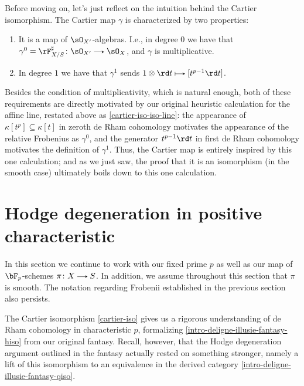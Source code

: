 Before moving on, let's just reflect on the intuition behind the Cartier isomorphism. The Cartier map $\gamma$ is characterized by two properties:
\begin{enumerate}
\item It is a map of $\sO_{X'}$-algebras. I.e., in degree $0$ we have that $\gamma^0 = \rF_{X/S}^\sharp \c \sO_{X'} \to \sO_X$, and $\gamma$ is multiplicative.
\item In degree $1$ we have that $\gamma^1$ sends $1 \otimes \rd t \mapsto [t^{p-1} \rd t]$.
\end{enumerate}
Besides the condition of multiplicativity, which is natural enough, both of these requirements are directly motivated by our original heuristic calculation for the affine line, restated above as \cref{cartier-iso-iso-line}: the appearance of $\kappa[t^p] \subseteq \kappa[t]$ in zeroth de Rham cohomology motivates the appearance of the relative Frobenius as $\gamma^0$, and the generator $t^{p-1} \rd t$ in first de Rham cohomology motivates the definition of $\gamma^1$. Thus, the Cartier map is  entirely inspired by this one calculation; and as we just saw, the proof that it is an isomorphism (in the smooth case) ultimately boils down to this one calculation.


\section{Hodge degeneration in positive characteristic}
\label{degenp}

\begin{notation}
  \label{degenp-setup}
  In this section we continue to work with our fixed prime $p$ as well as our map of $\bF_p$-schemes $\pi \c X \to S$. In addition, we assume throughout this section that $\pi$ is smooth. The notation regarding Frobenii established in the previous section also persists.
\end{notation}

The Cartier isomorphism \cref{cartier-iso} gives us a rigorous understanding of de Rham cohomology in characteristic $p$, formalizing \cref{intro-deligne-illusie-fantasy-hiso} from our original fantasy. Recall, however, that the Hodge degeneration argument outlined in the fantasy actually rested on something stronger, namely a lift of this isomorphism to an equivalence in the derived category \cref{intro-deligne-illusie-fantasy-qiso}.

